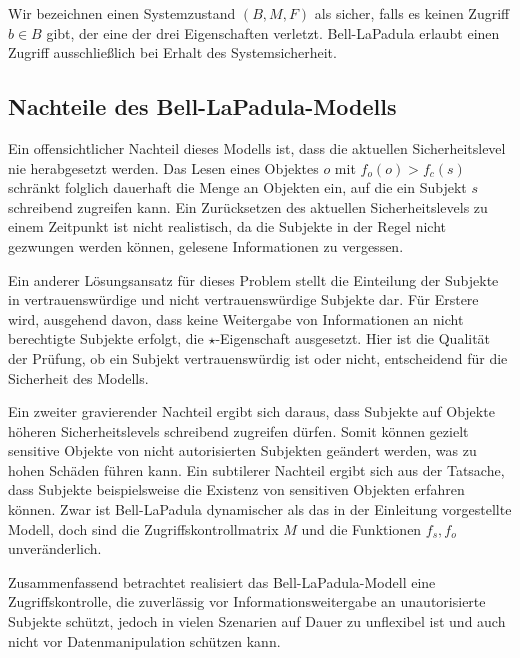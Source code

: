 Wir bezeichnen einen Systemzustand \((B, M, F)\) \indexBLPSystemStatus als sicher, falls es keinen Zugriff \(b \in B\) gibt, der eine der drei Eigenschaften verletzt. Bell-LaPadula erlaubt einen Zugriff ausschließlich bei Erhalt des Systemsicherheit.

\subsection{Nachteile des Bell-LaPadula-Modells}\indexBellLaPadula
Ein offensichtlicher Nachteil dieses Modells ist, dass die aktuellen Sicherheitslevel nie herabgesetzt werden. Das Lesen eines Objektes \(o\) mit \(f_o(o) > f_c(s)\) schränkt folglich dauerhaft die Menge an Objekten ein, auf die ein Subjekt \(s\) schreibend zugreifen kann. Ein Zurücksetzen des aktuellen Sicherheitslevels zu einem Zeitpunkt ist nicht realistisch, da die Subjekte in der Regel nicht gezwungen werden können, gelesene Informationen zu vergessen.

Ein anderer Lösungsansatz für dieses Problem stellt die Einteilung der Subjekte in vertrauenswürdige und nicht vertrauenswürdige  Subjekte dar. Für Erstere wird, ausgehend davon, dass keine Weitergabe von Informationen an nicht berechtigte Subjekte erfolgt, die \(\star\)-Eigenschaft ausgesetzt. Hier ist die Qualität der Prüfung, ob ein Subjekt vertrauenswürdig ist oder nicht, entscheidend für die Sicherheit des Modells. 

Ein zweiter gravierender Nachteil ergibt sich daraus, dass Subjekte auf Objekte höheren Sicherheitslevels schreibend zugreifen dürfen. Somit können gezielt sensitive Objekte von nicht autorisierten Subjekten geändert werden, was zu hohen Schäden führen kann.
Ein subtilerer Nachteil ergibt sich aus der Tatsache, dass Subjekte beispielsweise die Existenz von sensitiven Objekten erfahren können. %
Zwar ist Bell-LaPadula dynamischer als das in der Einleitung vorgestellte Modell, doch sind die Zugriffskontrollmatrix \(M\) und die Funktionen \(f_s, f_o\) unveränderlich. 

Zusammenfassend betrachtet realisiert das Bell-LaPadula-Modell eine Zugriffskontrolle, die zuverlässig vor Informationsweitergabe an unautorisierte Subjekte schützt, jedoch in vielen Szenarien auf Dauer zu unflexibel ist und auch nicht vor Datenmanipulation schützen kann.

